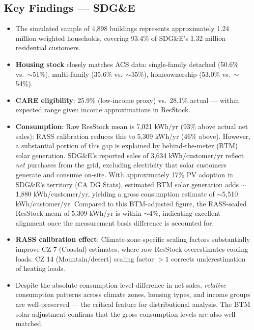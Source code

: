 \documentclass[12pt]{article}
\begin{document}


\subsection{Key Findings --- SDG\&E}

\begin{itemize}
    \item The simulated sample of 4,898 buildings represents approximately 1.24 million weighted households, covering 93.4\% of SDG\&E's 1.32 million residential customers.
    \item \textbf{Housing stock} closely matches ACS data: single-family detached (50.6\% vs.\ $\sim$51\%), multi-family (35.6\% vs.\ $\sim$35\%), homeownership (53.0\% vs.\ $\sim$54\%).
    \item \textbf{CARE eligibility}: 25.9\% (low-income proxy) vs.\ 28.1\% actual --- within expected range given income approximations in ResStock.
    \item \textbf{Consumption}: Raw ResStock mean is 7,021 kWh/yr (93\% above actual net sales); RASS calibration reduces this to 5,309 kWh/yr (46\% above). However, a substantial portion of this gap is explained by behind-the-meter (BTM) solar generation. SDG\&E's reported sales of 3,634 kWh/customer/yr reflect \textit{net} purchases from the grid, excluding electricity that solar customers generate and consume on-site. With approximately 17\% PV adoption in SDG\&E's territory (CA DG Stats), estimated BTM solar generation adds $\sim$1,880 kWh/customer/yr, yielding a gross consumption estimate of $\sim$5,510 kWh/customer/yr. Compared to this BTM-adjusted figure, the RASS-scaled ResStock mean of 5,309 kWh/yr is within $\sim$4\%, indicating excellent alignment once the measurement basis difference is accounted for.
    \item \textbf{RASS calibration effect}: Climate-zone-specific scaling factors substantially improve CZ 7 (Coastal) estimates, where raw ResStock overestimates cooling loads. CZ 14 (Mountain/desert) scaling factor $>1$ corrects underestimation of heating loads.
    \item Despite the absolute consumption level difference in net sales, \textit{relative} consumption patterns across climate zones, housing types, and income groups are well-preserved --- the critical feature for distributional analysis. The BTM solar adjustment confirms that the gross consumption levels are also well-matched.
\end{itemize}
\end{document}
